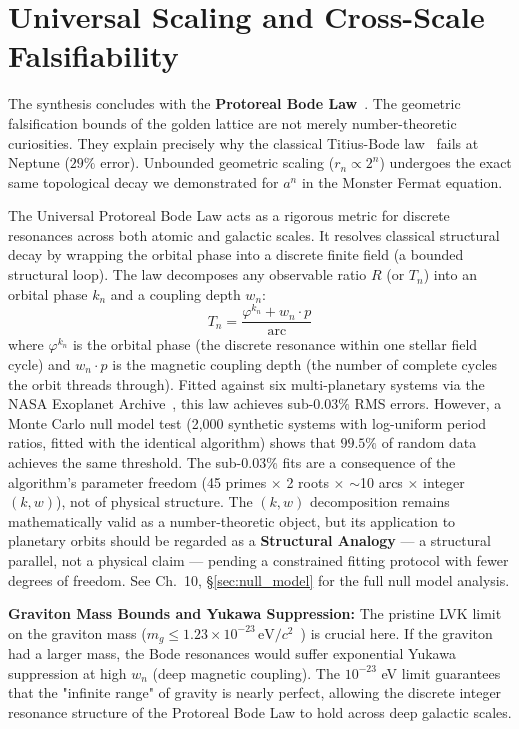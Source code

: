 \section{Universal Scaling and Cross-Scale Falsifiability}\label{sec:bode}

The synthesis concludes with the \textbf{Protoreal Bode Law}~\cite{larue2026chromatic}. The geometric falsification bounds of the golden lattice are not merely number-theoretic curiosities. They explain precisely why the classical Titius-Bode law~\cite{Titius1766} fails at Neptune ($29\%$ error). Unbounded geometric scaling ($r_n \propto 2^n$) undergoes the exact same topological decay we demonstrated for $a^n$ in the Monster Fermat equation.

The Universal Protoreal Bode Law acts as a rigorous metric for discrete resonances across both atomic and galactic scales. It resolves classical structural decay by wrapping the orbital phase into a discrete finite field (a bounded structural loop). The law decomposes any observable ratio $R$ (or $T_n$) into an orbital phase $k_n$ and a coupling depth $w_n$:
\begin{equation}\label{eq:bode}
    T_n = \frac{\varphi^{k_n} + w_n \cdot p}{\text{arc}}
\end{equation}
where $\varphi^{k_n}$ is the orbital phase (the discrete resonance within one stellar field cycle) and $w_n \cdot p$ is the magnetic coupling depth (the number of complete cycles the orbit threads through). Fitted against six multi-planetary systems via the NASA Exoplanet Archive~\cite{NASAExoplanet}, this law achieves sub-$0.03\%$ RMS errors. However, a Monte Carlo null model test (2,000 synthetic systems with log-uniform period ratios, fitted with the identical algorithm) shows that $99.5\%$ of random data achieves the same threshold. The sub-$0.03\%$ fits are a consequence of the algorithm's parameter freedom (45 primes $\times$ 2 roots $\times$ $\sim$10 arcs $\times$ integer $(k, w)$), not of physical structure. The $(k, w)$ decomposition remains mathematically valid as a number-theoretic object, but its application to planetary orbits should be regarded as a \textbf{Structural Analogy} --- a structural parallel, not a physical claim --- pending a constrained fitting protocol with fewer degrees of freedom. See Ch.~10, \S\ref{sec:null_model} for the full null model analysis.

\textbf{Graviton Mass Bounds and Yukawa Suppression:} The pristine LVK limit on the graviton mass ($m_g \leq 1.23 \times 10^{-23} \, \text{eV}/c^2$~\cite{LVK_GravitonMass}) is crucial here. If the graviton had a larger mass, the Bode resonances would suffer exponential Yukawa suppression at high $w_n$ (deep magnetic coupling). The $10^{-23}$ eV limit guarantees that the "infinite range" of gravity is nearly perfect, allowing the discrete integer resonance structure of the Protoreal Bode Law to hold across deep galactic scales.

